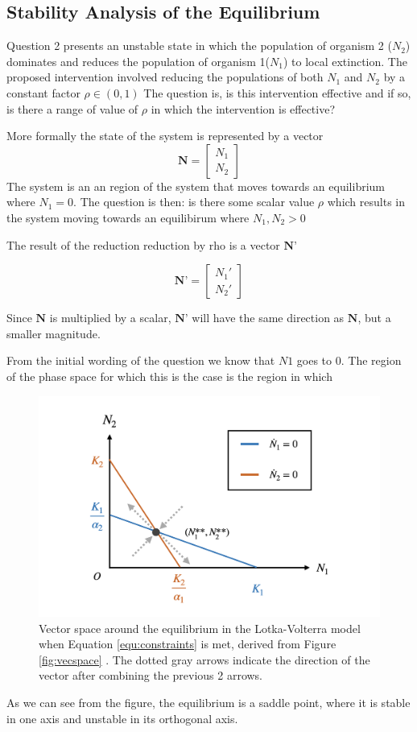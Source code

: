 \subsection{Stability Analysis of the Equilibrium}



Question 2 presents an unstable state in which the population of organism 2 ($N_2$) dominates and reduces the population of organism 1($N_1$) to local extinction. The proposed intervention involved reducing the populations of both $N_1$ and $N_2$ by a constant factor $\rho \in (0,1)$ The question is, is this intervention effective and if so, is there a range of value of $\rho$ in which the intervention is effective? 

More formally the state of the system is represented by a vector 
$$ \textbf{N} = \begin{bmatrix}N_1 \\ N_2\end{bmatrix}$$
The system is an an region of the system that moves towards an equilibrium where $N_1=0$. The question is then: is there some scalar value $\rho$ which results in the system moving towards an equilibirum where $N_1, N_2 > 0$

The result of the reduction reduction by rho is a vector $\textbf{N'}$

$$ \textbf{N'} = \begin{bmatrix}N_1' \\ N_2'\end{bmatrix}$$

Since $\textbf{N}$ is multiplied by a scalar, $\textbf{N'}$ will have the same direction as $\textbf{N}$, but a smaller magnitude. 

From the initial wording of the question we know that $N1$ goes to 0. The region of the phase space for which this is the case is the region in which 


\begin{figure}[h]
  \centering
  \includegraphics[width = \textwidth]{fig/graph_003.png}
  \caption {Vector space around the equilibrium in the Lotka-Volterra model when Equation \ref{equ:constraints} is met, derived from Figure \ref{fig:vecspace} . The dotted gray arrows indicate the direction of the vector after combining the previous 2 arrows.}
  \label{fig:equilibrium_stability}
\end{figure}

As we can see from the figure, the equilibrium is a saddle point, where it is stable in one axis and unstable in its orthogonal axis.
